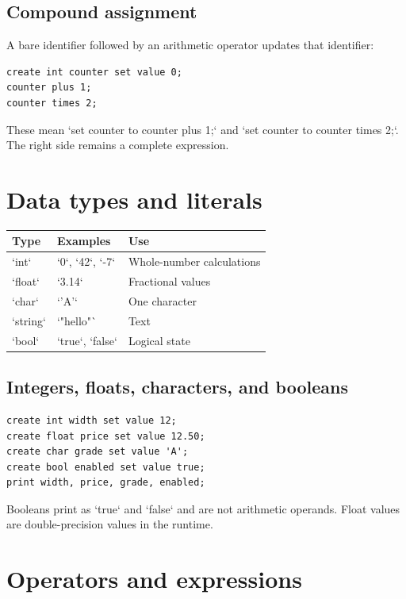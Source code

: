 \documentclass[10.5pt,a4paper]{article}
\begin{document}
\subsection{Compound assignment}
A bare identifier followed by an arithmetic operator updates that identifier:
\begin{lstlisting}
create int counter set value 0;
counter plus 1;
counter times 2;
\end{lstlisting}
These mean `set counter to counter plus 1;` and `set counter to counter times 2;`. The right side remains a complete expression.
\section{Data types and literals}
\begin{tabularx}{\textwidth}{l l X}\toprule Type & Examples & Use\\\midrule
`int` & `0`, `42`, `-7` & Whole-number calculations\\
`float` & `3.14` & Fractional values\\
`char` & `'A'` & One character\\
`string` & `"hello"` & Text\\
`bool` & `true`, `false` & Logical state\\\bottomrule\end{tabularx}
\subsection{Integers, floats, characters, and booleans}
\begin{lstlisting}
create int width set value 12;
create float price set value 12.50;
create char grade set value 'A';
create bool enabled set value true;
print width, price, grade, enabled;
\end{lstlisting}
Booleans print as `true` and `false` and are not arithmetic operands. Float values are double-precision values in the runtime.
\section{Operators and expressions}
\end{document}
